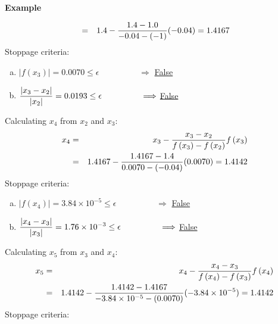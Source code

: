 \begin{MyExample}{\begin{center}{\bf Example}\end{center}}
\begin{list}{{\bf Iteration } (k=):~}{}
\begin{eqnarray}
                           &=& 1.4 - \displaystyle\frac{1.4 - 1.0}{-0.04-(-1)}  (-0.04) = 1.4167\nonumber
                  \end{eqnarray}
                  Stoppage criteria:
                    \begin{enumerate}[(a)]
                         \item $\left|f\left(x_{3}\right)\right| = 0.0070 \leq \epsilon \hspace{2cm} \Longrightarrow$ \underline{False}
                         \item $\displaystyle\frac{\left|x_{3}-x_{2}\right|}{\left|x_{2}\right|} = 0.0193 \leq \epsilon \hspace{1.65cm} \Longrightarrow$ \underline{False}
                    \end{enumerate}
            \item Calculating $x_{4}$ from $x_{2}$ and $x_{3}$:
                  \begin{eqnarray}
                      x_{4} &=& x_{3} - \displaystyle\frac{ x_{3} - x_{2} }{f\left(x_{3}\right) - f\left(x_{2}\right)} f\left(x_{3}\right) \nonumber \\
                           &=& 1.4167 - \displaystyle\frac{1.4167 - 1.4}{0.0070-(-0.04)}  (0.0070) = 1.4142\nonumber
                  \end{eqnarray}
                  Stoppage criteria:
                    \begin{enumerate}[(a)]
                         \item $\left|f\left(x_{4}\right)\right| = 3.84\times 10^{-5} \leq \epsilon \hspace{2cm} \Longrightarrow$ \underline{False}
                         \item $\displaystyle\frac{\left|x_{4}-x_{3}\right|}{\left|x_{3}\right|} = 1.76\times 10^{-3} \leq \epsilon \hspace{1.65cm} \Longrightarrow$ \underline{False}
                    \end{enumerate}
            \item Calculating $x_{5}$ from $x_{3}$ and $x_{4}$:
                  \begin{eqnarray}
                      x_{5} &=& x_{4} - \displaystyle\frac{ x_{4} - x_{3} }{f\left(x_{4}\right) - f\left(x_{3}\right)} f\left(x_{4}\right) \nonumber \\
                           &=& 1.4142 - \displaystyle\frac{1.4142 - 1.4167}{-3.84\times 10^{-5}-(0.0070)}  (-3.84\times 10^{-5}) = 1.4142\nonumber
                  \end{eqnarray}
                  Stoppage criteria:

\end{list}
\end{MyExample}
